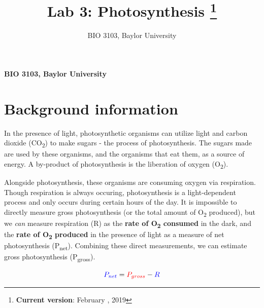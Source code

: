 \documentclass[11pt,]{article}
\title{Lab 3: Photosynthesis \thanks{\textbf{Current version}: February , 2019}  }
\author{\Large BIO 3103, Baylor University\vspace{0.05in} \newline\normalsize\emph{}  }
\date{}
\newcommand*{\authorfont}{\fontfamily{phv}\selectfont}
\begin{document}
	
%



{%
\setlength{\parindent}{0pt}
\thispagestyle{plain}
{\fontsize{18}{20}\selectfont\raggedright 
\maketitle  %

}

{
   \vskip 13.5pt\relax \normalsize\fontsize{11}{12} 
\textbf{\authorfont BIO 3103, Baylor University} \hskip 15pt \emph{\small }   

}

}




\noindent  \hypertarget{background-information}{%
\section{Background information}\label{background-information}}

\newcommand{\textunderscript}[1]{$_{\text{#1}}$}

In the presence of light, photosynthetic organisms can utilize light and
carbon dioxide (CO\textsubscript{2}) to make sugars - the process of
photosynthesis. The sugars made are used by these organisms, and the
organisms that eat them, as a source of energy. A by-product of
photosynthesis is the liberation of oxygen (O\textsubscript{2}).

Alongside photosynthesis, these organisms are consuming oxygen via
respiration. Though respiration is always occuring, photosynthesis is a
light-dependent process and only occurs during certain hours of the day.
It is impossible to directly measure gross photosynthesis (or the total
amount of O\textsubscript{2} produced), but we \emph{can} measure
respiration (R) as the \textbf{rate of O\textsubscript{2} consumed} in
the dark, and the \textbf{rate of O\textsubscript{2} produced} in the
presence of light as a measure of net photosynthesis
(P\textsubscript{net}). Combining these direct measurements, we can
estimate gross photosynthesis (P\textsubscript{gross}).

\begin{equation}
\color{blue} P_{net} \color{black}= \color{red}P_{gross} \color{black}- \color{blue}R
\end{equation}
\end{document}
